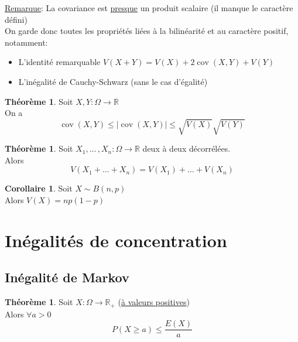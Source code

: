 \documentclass[10pt,a4paper]{article}
\theoremstyle{definition}
\newtheorem{theorem}[proposition]{Théorème}
\newtheorem{corollaire}[proposition]{Corollaire}
\DeclareMathOperator{\cov}{cov}
\begin{document}
\noindent \uline{Remarque}: La covariance est \uline{presque} un produit scalaire (il manque le caractère défini) \\
On garde donc toutes les propriétés liées à la bilinéarité et au caractère positif, notamment:
\begin{itemize}
\item L'identité remarquable $V(X + Y) = V(X) + 2\cov(X, Y) + V(Y)$
\item L'inégalité de Cauchy-Schwarz (sans le cas d'égalité)
\end{itemize}
\begin{theorem}
Soit $X, Y: \Omega \to \mathbb{R}$ \\
On a
\[ \cov(X, Y) \leq |\cov(X, Y)| \leq \sqrt{V(X)} \sqrt{V(Y)} \]
\end{theorem}
\begin{theorem}
Soit $X_1, ...\,, X_n: \Omega \to \mathbb{R}$ deux à deux décorrélées. \\
Alors 
\[ V(X_1 + ... + X_n) = V(X_1) + ... + V(X_n) \]
\end{theorem}
\begin{corollaire}
Soit $X \sim B(n, p)$ \\
Alors $V(X) = np(1-p)$
\end{corollaire}

\section{Inégalités de concentration}
\subsection{Inégalité de Markov}
\begin{theorem}
Soit $X: \Omega \to \mathbb{R}_+$ (\uline{à valeurs positives}) \\
Alors $\forall a > 0$
\[ P(X \geq a) \leq \frac{E(X)}{a} \]
\end{theorem}
\end{document}
